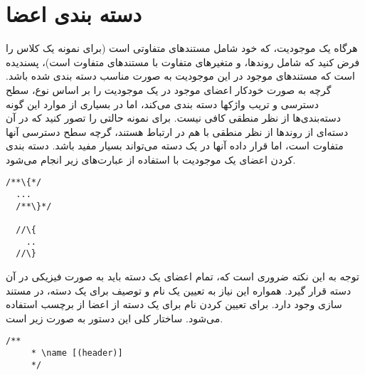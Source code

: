 %
% 
% 
% 
%
\section{دسته بندی اعضا}

هرگاه یک موجودیت، که خود شامل مستندهای متفاوتی است (برای نمونه یک کلاس را فرض
کنید که شامل روندها، و متغیرهای متفاوت با مستندهای متفاوت است)، پسندیده است که
مستندهای موجود در این موجودیت به صورت مناسب دسته بندی شده باشد. گرچه
 به صورت خودکار اعضای موجود در یک موجودیت را  بر اساس نوع، سطح
دسترسی  و تریب واژکها دسته بندی می‌کند، اما در بسیاری از موارد این گونه
دسته‌بندی‌ها از نظر منطقی کافی نیست. برای نمونه حالتی را تصور کنید که در آن
دسته‌ای از روندها از نظر منطقی با هم در ارتباط هستند، گرچه سطح دسترسی آنها
متفاوت است،  اما قرار داده آنها در یک دسته می‌تواند بسیار مفید باشد. دسته بندی
کردن اعضای یک موجودیت با استفاده از عبارت‌های زیر انجام می‌شود.
\begin{latin}
\lstset{language=C++}  
\begin{lstlisting}[frame=single] 
  /**\{*/
  ...
  /**\}*/
  
  //\{
    ..
  //\}
\end{lstlisting}
\end{latin}

توجه به این نکته ضروری است که، تمام اعضای یک دسته باید به صورت فیزیکی در آن دسته
قرار گیرد. همواره این نیاز  به تعیین یک نام  و توصیف برای یک دسته، در مستند سازی
وجود دارد. برای تعیین کردن نام برای یک دسته از اعضا از برچسب  استفاده
می‌شود. ساختار کلی این دستور به صورت زیر است.

\begin{latin}
\lstset{language=C++}  
\begin{lstlisting}[frame=single] 
    /**
     * \name [(header)]
     */
\end{lstlisting}
\end{latin}

